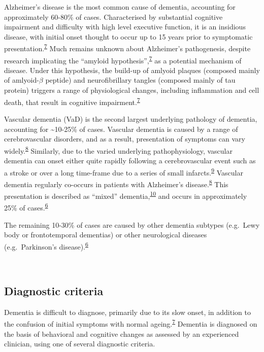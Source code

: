 \documentclass[a4paper, twoside]{templates/ociamthesis}
\begin{document}
Alzheimer's disease is the most common cause of dementia, accounting for approximately 60-80\% of cases. Characterised by substantial cognitive impairment and difficulty with high level executive function, it is an insidious disease, with initial onset thought to occur up to 15 years prior to symptomatic presentation.\textsuperscript{\protect\hyperlink{ref-robinson2015}{7}} Much remains unknown about Alzheimer's pathogenesis, despite research implicating the ``amyloid hypothesis'',\textsuperscript{\protect\hyperlink{ref-robinson2015}{7}} as a potential mechanism of disease. Under this hypothesis, the build-up of amlyoid plaques (composed mainly of amlyoid-\(\beta\) peptide) and neurofibrillary tangles (composed mainly of tau protein) triggers a range of physiological changes, including inflammation and cell death, that result in cognitive impairment.\textsuperscript{\protect\hyperlink{ref-robinson2015}{7}}

Vascular dementia (VaD) is the second largest underlying pathology of dementia, accounting for \textasciitilde10-25\% of cases. Vascular dementia is caused by a range of cerebrovascular disorders, and as a result, presentation of symptoms can vary widely.\textsuperscript{\protect\hyperlink{ref-iadecola2013}{8}} Similarly, due to the varied underlying pathophysiology, vascular dementia can onset either quite rapidly following a cerebrovascular event such as a stroke or over a long time-frame due to a series of small infarcts.\textsuperscript{\protect\hyperlink{ref-venkat2015}{9}} Vascular dementia regularly co-occurs in patients with Alzheimer's disease.\textsuperscript{\protect\hyperlink{ref-iadecola2013}{8}} This presentation is described as ``mixed'' dementia,\textsuperscript{\protect\hyperlink{ref-custodio2017}{10}} and occurs in approximately 25\% of cases.\textsuperscript{\protect\hyperlink{ref-burns2009}{6}}

The remaining 10-30\% of cases are caused by other dementia subtypes (e.g.~Lewy body or frontotemporal dementias) or other neurological diseases (e.g.~Parkinson's disease).\textsuperscript{\protect\hyperlink{ref-burns2009}{6}}

~

\hypertarget{diagnostic-criteria}{%
\subsection{Diagnostic criteria}\label{diagnostic-criteria}}

Dementia is difficult to diagnose, primarily due to its slow onset, in addition to the confusion of initial symptoms with normal ageing.\textsuperscript{\protect\hyperlink{ref-robinson2015}{7}} Dementia is diagnosed on the basis of behavioral and cognitive changes as assessed by an experienced clinician, using one of several diagnostic criteria.
\end{document}
